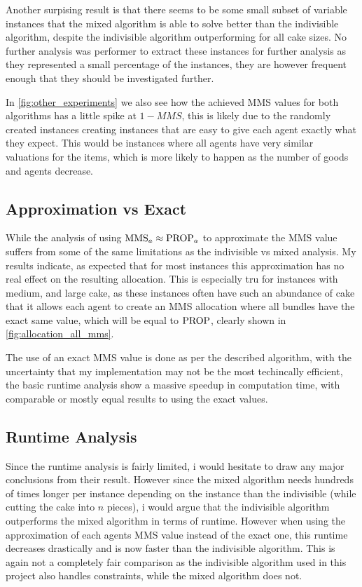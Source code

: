 Another surpising result is that there seems to be some small subset of variable instances that the mixed algorithm is able to solve better than the indivisible algorithm, despite the indivisible algorithm outperforming for all cake sizes. No further analysis was performer to extract these instances for further analysis as they represented a small percentage of the instances, they are however frequent enough that they should be investigated further. 

In \autoref{fig:other_experiments} we also see how the achieved MMS values for both algorithms has a little spike at $1-MMS$, this is likely due to the randomly created instances creating instances that are easy to give each agent exactly what they expect. This would be instances where all agents have very similar valuations for the items, which is more likely to happen as the number of goods and agents decrease. 



\subsection{Approximation vs Exact}
While the analysis of using $\text{MMS}_a\approx\text{PROP}_a$ to approximate the MMS value suffers from some of the same limitations as the indivisible vs mixed analysis. My results indicate, as expected that for most instances this approximation has no real effect on the resulting allocation. This is especially tru for instances with medium, and large cake, as these instances often have such an abundance of cake that it allows each agent to create an MMS allocation where all bundles have the exact same value, which will be equal to $\text{PROP}$, clearly shown in \autoref{fig:allocation_all_mms}.

The use of an exact MMS value is done as per the described algorithm\cite{mms}, with the uncertainty that my implementation may not be the most techincally efficient, the basic runtime analysis show a massive speedup in computation time, with comparable or mostly equal results to using the exact values.


\subsection{Runtime Analysis}
Since the runtime analysis is fairly limited, i would hesitate to draw any major conclusions from their result. However since the mixed algorithm needs hundreds of times longer per instance depending on the instance than the indivisible (while cutting the cake into $n$ pieces), i would argue that the indivisible algorithm outperforms the mixed algorithm in terms of runtime. However when using the approximation of each agents MMS value instead of the exact one, this runtime decreases drastically and is now faster than the indivisible algorithm. This is again not a completely fair comparison as the indivisible algorithm used in this project also handles constraints, while the mixed algorithm does not.